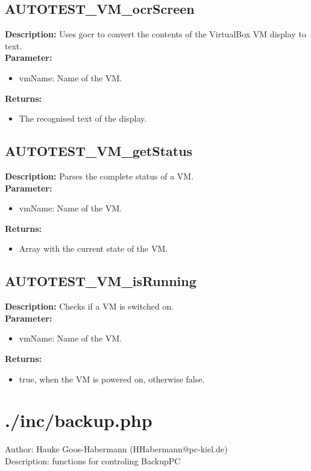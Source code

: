 \subsection{AUTOTEST\_VM\_ocrScreen}
\textbf{Description:} Uses gocr to convert the contents of the VirtualBox VM display to text.\\
\textbf{Parameter:}
\begin{itemize}
\item vmName: Name of the VM.
\end{itemize}
\textbf{Returns:}
\begin{itemize}
\item The recognised text of the display.
\end{itemize}

\subsection{AUTOTEST\_VM\_getStatus}
\textbf{Description:} Parses the complete status of a VM.\\
\textbf{Parameter:}
\begin{itemize}
\item vmName: Name of the VM.
\end{itemize}
\textbf{Returns:}
\begin{itemize}
\item Array with the current state of the VM.
\end{itemize}

\subsection{AUTOTEST\_VM\_isRunning}
\textbf{Description:} Checks if a VM is switched on.\\
\textbf{Parameter:}
\begin{itemize}
\item vmName: Name of the VM.
\end{itemize}
\textbf{Returns:}
\begin{itemize}
\item true, when the VM is powered on, otherwise false.
\end{itemize}

\newpage\section{./inc/backup.php}
 Author: Hauke Goos-Habermann (HHabermann@pc-kiel.de)\\
 Description: functions for controling BackupPC\\

